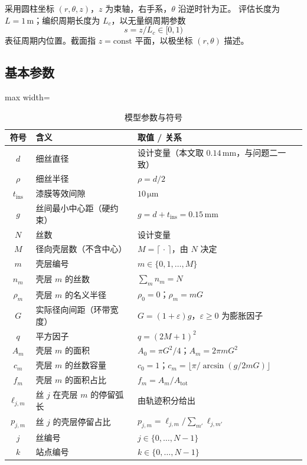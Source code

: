 \documentclass[12pt, a4paper]{ctexart}
\newcommand{\U}[1]{\ensuremath{\,\mathrm{#1}}}
\newcommand{\Umm}{\ensuremath{\,\mathrm{mm}}}
\begin{document}
采用圆柱坐标 $(r,\theta,z)$，$z$ 为束轴，右手系，$\theta$ 沿逆时针为正。
评估长度为 $L=1\U{m}$；编织周期长度为 $L_c$，以无量纲周期参数
\begin{equation}
s = z/L_c \in [0,1)
\end{equation}
表征周期内位置。截面指 $z=\text{const}$ 平面，以极坐标 $(r,\theta)$ 描述。

\subsection{基本参数}

\begin{table}[htbp]
\centering
\caption{模型参数与符号}
\label{tab:symbols}
\begin{adjustbox}{max width=\textwidth}
\begin{tabular}{cll}
\toprule
符号 & 含义 & 取值 / 关系 \\
\midrule
$d$ & 细丝直径 & 设计变量（本文取 $0.14\Umm$，与问题二一致） \\
$\rho$ & 细丝半径 & $\rho = d/2$ \\
$t_{\mathrm{ins}}$ & 漆膜等效间隙 & $10\U{\mu m}$ \\
$g$ & 丝间最小中心距（硬约束） & $g = d + t_{\mathrm{ins}} = 0.15\Umm$ \\
$N$ & 丝数 & 设计变量 \\
$M$ & 径向壳层数（不含中心） & $M = \lceil\,\cdot\,\rceil$，由 $N$ 决定 \\
$m$ & 壳层编号 & $m \in \{0,1,\dots,M\}$ \\
$n_m$ & 壳层 $m$ 的丝数 & $\sum_m n_m = N$ \\
$\rho_m$ & 壳层 $m$ 的名义半径 & $\rho_0=0$；$\rho_m = mG$ \\
$G$ & 实际径向间距（环带宽度） & $G = (1+\varepsilon)g$，$\varepsilon\ge 0$ 为膨胀因子 \\
$q$ & 平方因子 & $q = (2M+1)^2$ \\
$A_m$ & 壳层 $m$ 的面积 & $A_0=\pi G^2/4$；$A_m = 2\pi m G^2$ \\
$c_m$ & 壳层 $m$ 的丝数容量 & $c_0=1$；$c_m=\lfloor \pi/\arcsin(g/2mG)\rfloor$ \\
$f_m$ & 壳层 $m$ 的面积占比 & $f_m = A_m / A_{\mathrm{tot}}$ \\
$\ell_{j,m}$ & 丝 $j$ 在壳层 $m$ 的停留弧长 & 由轨迹积分给出 \\
$p_{j,m}$ & 丝 $j$ 的壳层停留占比 & $p_{j,m} = \ell_{j,m}/\sum_{m'}\ell_{j,m'}$ \\
$j$ & 丝编号 & $j \in \{0,\dots,N-1\}$ \\
$k$ & 站点编号 & $k \in \{0,\dots,N-1\}$ \\
\bottomrule
\end{tabular}
\end{adjustbox}
\end{table}
\end{document}
